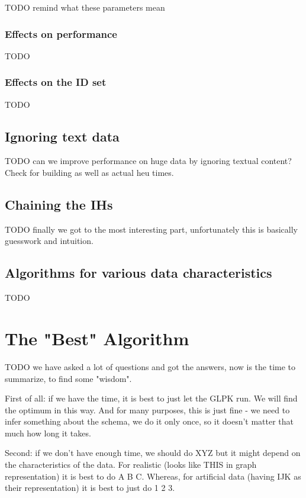 \documentclass[a4paper,12pt,oneside]{report}
\theoremstyle{definition}
\begin{document}
TODO remind what these parameters mean

\subsubsection{Effects on performance}

TODO

\subsubsection{Effects on the ID set}

TODO

\subsection{Ignoring text data}

TODO can we improve performance on huge data by ignoring textual content? Check for building as well as actual heu times.

\subsection{Chaining the IHs}

TODO finally we got to the most interesting part, unfortunately this is basically guesswork and intuition.

\subsection{Algorithms for various data characteristics}

TODO

\section{The "Best" Algorithm}

TODO we have asked a lot of questions and got the answers, now is the time to summarize, to find some "wisdom".

First of all: if we have the time, it is best to just let the GLPK run. 
We will find the optimum in this way. 
And for many purposes, this is just fine - we need to infer something about the schema, we do it only once, so it doesn't matter that much how long it takes.

Second: if we don't have enough time, we should do XYZ but it might depend on the characteristics of the data.
For realistic (looks like THIS in graph representation) it is best to do A B C.
Whereas, for artificial data (having IJK as their representation) it is best to just do 1 2 3.
\end{document}
